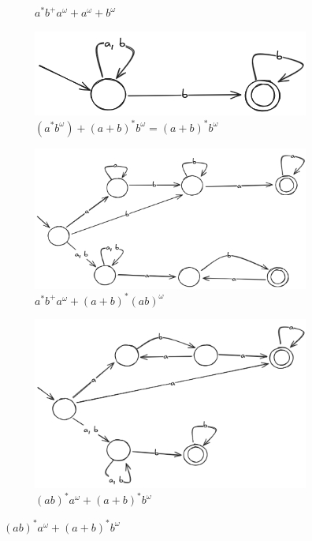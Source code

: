 \documentclass{article}
\begin{document}
\begin{figure}[!htb]
\begin{subfigure}[b]{0.5\textwidth}
		\caption{$a^*b^+a^\omega + a^\omega + b^\omega$}
	\end{subfigure}
	\hfil
	\begin{subfigure}[b]{0.3\textwidth}
		\centering
		\includegraphics[width=\textwidth]{04-10-10.png}
		\caption{$(a^*b^\omega) + (a + b)^*b^\omega = (a + b)^*b^\omega$}
	\end{subfigure}
	\hfil
	\begin{subfigure}[b]{0.5\textwidth}
		\centering
		\includegraphics[width=\textwidth]{04-10-11.png}
		\caption{$a^*b^+a^\omega + (a + b)^*(ab)^\omega$}
	\end{subfigure}
	\hfil
	\begin{subfigure}[b]{0.4\textwidth}
		\centering
		\includegraphics[width=\textwidth]{04-10-12.png}
		\caption{$(ab)^*a^\omega + (a + b)^*b^\omega$}
	\end{subfigure}
\end{figure}
\end{document}
